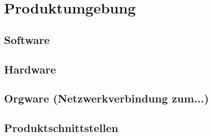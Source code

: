 \section{Produktumgebung}

\subsection{Software}

\subsection{Hardware}

\subsection{Orgware (Netzwerkverbindung zum...)}

\subsection{Produktschnittstellen}